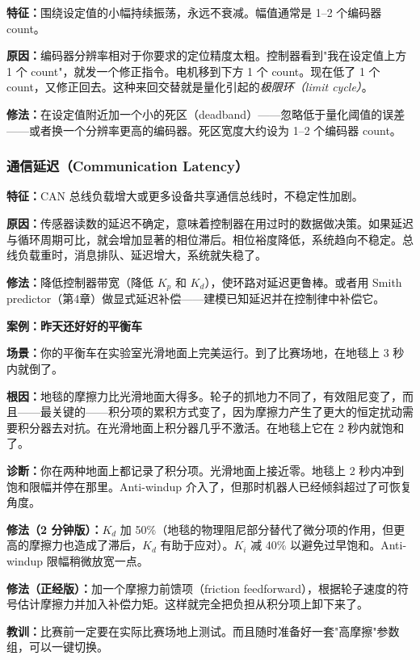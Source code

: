 \textbf{特征：}围绕设定值的小幅持续振荡，永远不衰减。幅值通常是 1--2 个编码器 count。

\textbf{原因：}编码器分辨率相对于你要求的定位精度太粗。控制器看到"我在设定值上方 1 个 count"，就发一个修正指令。电机移到下方 1 个 count。现在低了 1 个 count，又修正回去。这种来回交替就是量化引起的\textit{极限环（limit cycle）}。

\textbf{修法：}在设定值附近加一个小的死区（deadband）——忽略低于量化阈值的误差——或者换一个分辨率更高的编码器。死区宽度大约设为 1--2 个编码器 count。

\subsubsection{通信延迟（Communication Latency）}

\textbf{特征：}CAN 总线负载增大或更多设备共享通信总线时，不稳定性加剧。

\textbf{原因：}传感器读数的延迟不确定，意味着控制器在用过时的数据做决策。如果延迟与循环周期可比，就会增加显著的相位滞后。相位裕度降低，系统趋向不稳定。总线负载重时，消息排队、延迟增大，系统就失稳了。

\textbf{修法：}降低控制器带宽（降低 $K_p$ 和 $K_d$），使环路对延迟更鲁棒。或者用 Smith predictor（第4章）做显式延迟补偿——建模已知延迟并在控制律中补偿它。



\begin{mdframed}[linewidth=1pt, innertopmargin=10pt, innerbottommargin=10pt]
\textbf{案例：昨天还好好的平衡车}

\vspace{0.3em}
\textbf{场景：}你的平衡车在实验室光滑地面上完美运行。到了比赛场地，在地毯上 3 秒内就倒了。

\textbf{根因：}地毯的摩擦力比光滑地面大得多。轮子的抓地力不同了，有效阻尼变了，而且——最关键的——积分项的累积方式变了，因为摩擦力产生了更大的恒定扰动需要积分器去对抗。在光滑地面上积分器几乎不激活。在地毯上它在 2 秒内就饱和了。

\textbf{诊断：}你在两种地面上都记录了积分项。光滑地面上接近零。地毯上 2 秒内冲到饱和限幅并停在那里。Anti-windup 介入了，但那时机器人已经倾斜超过了可恢复角度。

\textbf{修法（2 分钟版）：}$K_d$ 加 50\%（地毯的物理阻尼部分替代了微分项的作用，但更高的摩擦力也造成了滞后，$K_d$ 有助于应对）。$K_i$ 减 40\% 以避免过早饱和。Anti-windup 限幅稍微放宽一点。

\textbf{修法（正经版）：}加一个摩擦力前馈项（friction feedforward），根据轮子速度的符号估计摩擦力并加入补偿力矩。这样就完全把负担从积分项上卸下来了。

\textbf{教训：}比赛前一定要在实际比赛场地上测试。而且随时准备好一套"高摩擦"参数组，可以一键切换。
\end{mdframed}

